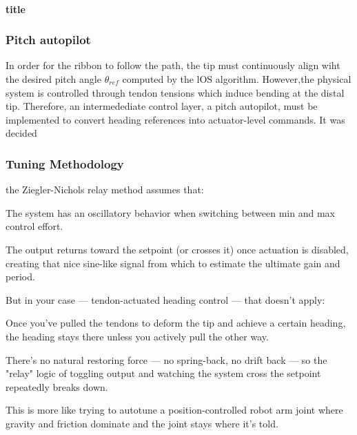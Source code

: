 \paragraph*{title}

\subsubsection{Pitch autopilot}
In order for the ribbon to follow the path, the tip must continuously align wiht the desired pitch angle \(\theta_{ref}\) computed by the lOS algorithm. However,the physical system is controlled through tendon tensions which induce bending at the distal tip. Therefore, an intermedediate control layer, a pitch autopilot, must be implemented to convert heading references into actuator-level commands.
\newline \newline
It was decided 

\subsubsection{Tuning Methodology}
the Ziegler-Nichols relay method assumes that:

The system has an oscillatory behavior when switching between min and max control effort.

The output returns toward the setpoint (or crosses it) once actuation is disabled, creating that nice sine-like signal from which to estimate the ultimate gain and period.

But in your case — tendon-actuated heading control — that doesn’t apply:

Once you've pulled the tendons to deform the tip and achieve a certain heading, the heading stays there unless you actively pull the other way.

There’s no natural restoring force — no spring-back, no drift back — so the "relay" logic of toggling output and watching the system cross the setpoint repeatedly breaks down.

This is more like trying to autotune a position-controlled robot arm joint where gravity and friction dominate and the joint stays where it's told.
